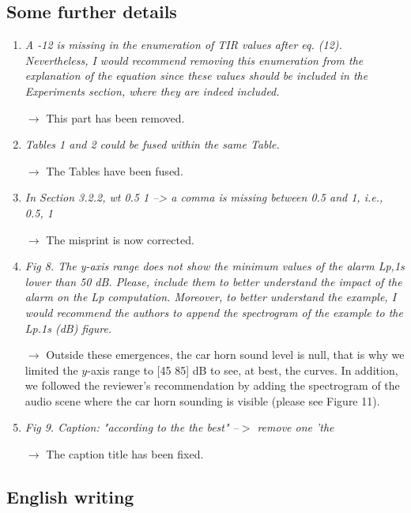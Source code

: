 \documentclass[10pt]{article}
\begin{document}
\subsection{Some further details}

\begin{enumerate}
\item \emph{A -12 is missing in the enumeration of TIR values after eq. (12). Nevertheless, I would recommend removing this enumeration from the explanation of the equation since these values should be included in the Experiments section, where they are indeed included.}

$\rightarrow$ This part has been removed.

\item \emph{Tables 1 and 2 could be fused within the same Table.}

$\rightarrow$ The Tables have been fused.

\item \emph{In Section 3.2.2, wt {0.5 1} --> a comma is missing between 0.5 and 1, i.e., {0.5, 1} }

$\rightarrow$ The misprint is now corrected.

\item \emph{Fig 8. The y-axis range does not show the minimum values of the alarm Lp,1s lower than 50 dB. Please, include them to better understand the impact of the alarm on the Lp computation. Moreover, to better understand the example, I would recommend the authors to append the spectrogram of the example to the Lp.1s (dB) figure.}

$\rightarrow$ Outside these emergences, the car horn sound level is null, that is why we limited the $y$-axis range to [45 85] dB to see, at best, the curves. In addition, we followed the reviewer's recommendation by adding the spectrogram of the audio scene where the car horn sounding is visible (please see Figure 11).

\item \emph{Fig 9. Caption: "according to the the best" --$>$ remove one 'the}

$\rightarrow$ The caption title has been fixed.

\end{enumerate}
\subsection{English writing}
\end{document}

